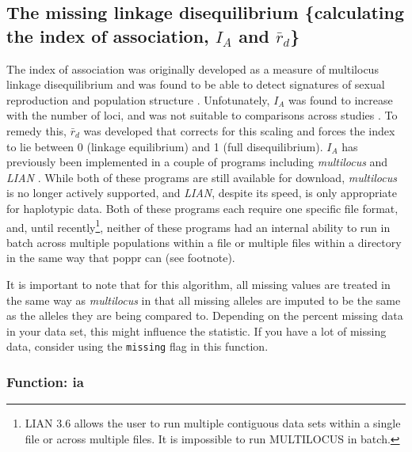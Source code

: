 \documentclass[letterpaper]{article}\usepackage[]{graphicx}\usepackage[]{color}
\newcommand{\tab}{\hspace*{1em}}
\begin{document}
\subsection{The missing linkage disequilibrium \{calculating the index of association, $I_A$ and $\bar r_d$\}}
\label{index:iard}

\tab\tab The index of association was originally developed as a measure of multilocus linkage disequilibrium \cite{Brown:1980} and was found to be able to detect signatures of sexual reproduction and population structure \cite{Brown:1980, Smith:1993}. Unfotunately, $I_A$ was found to increase with the number of loci, and was not suitable to comparisons across studies \cite{Agapow:2001}. To remedy this, $\bar{r}_d$ was developed that corrects for this scaling and forces the index to lie between 0 (linkage equilibrium) and 1 (full disequilibrium). $I_A$ has previously been implemented in a couple of programs including \textit{multilocus} \cite{Agapow:2001} and \textit{LIAN} \cite{Haubold:2000}. While both of these programs are still available for download, \textit{multilocus} is no longer actively supported, and \textit{LIAN}, despite its speed, is only appropriate for haplotypic data. Both of these programs each require one specific file format, and, until recently\footnote{LIAN 3.6 allows the user to run multiple contiguous data sets within a single file or across multiple files. It is impossible to run MULTILOCUS in batch.}, neither of these programs had an internal ability to run in batch across multiple populations within a file or multiple files within a directory in the same way that poppr can (see footnote).

It is important to note that for this algorithm, all missing values are treated in the same way as \textit{multilocus} in that all missing alleles are imputed to be the same as the alleles they are being compared to. Depending on the percent missing data in your data set, this might influence the statistic. If you have a lot of missing data, consider using the \texttt{missing} flag in this function.
\subsubsection{Function: ia}
\label{index:iard:ia}
\end{document}
